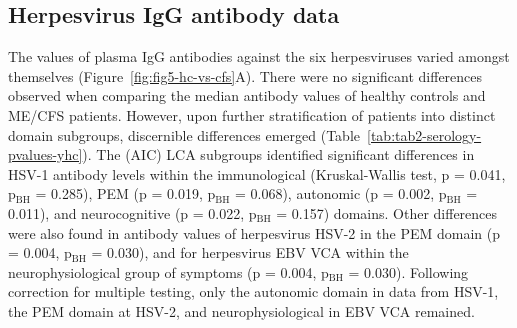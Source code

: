 \subsection{Herpesvirus IgG antibody data}

The values of plasma IgG antibodies against the six herpesviruses varied amongst themselves (Figure~\ref{fig:fig5-hc-vs-cfs}A).
There were no significant differences observed when comparing the median antibody values of healthy controls and ME/CFS patients.
However, upon further stratification of patients into distinct domain subgroups, discernible differences emerged (Table~\ref{tab:tab2-serology-pvalues-yhc}).
The (AIC) LCA subgroups identified significant differences in HSV-1 antibody levels within the immunological (Kruskal-Wallis test, p = 0.041, p$_{\text{BH}}$ = 0.285), PEM (p = 0.019, p$_{\text{BH}}$ = 0.068), autonomic (p = 0.002, p$_{\text{BH}}$ = 0.011), and neurocognitive (p = 0.022, p$_{\text{BH}}$ = 0.157) domains.
Other differences were also found in antibody values of herpesvirus HSV-2 in the PEM domain (p = 0.004, p$_{\text{BH}}$ = 0.030), and for herpesvirus EBV VCA within the neurophysiological group of symptoms (p = 0.004, p$_{\text{BH}}$ = 0.030).
Following correction for multiple testing, only the autonomic domain in data from HSV-1, the PEM domain at HSV-2, and neurophysiological in EBV VCA remained.

